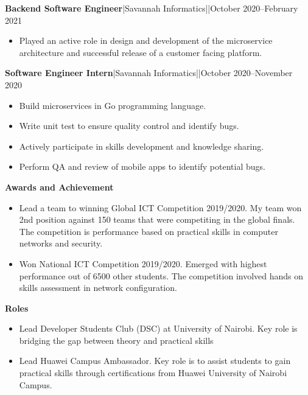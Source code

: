 \documentclass[a4paper]{article}
\begin{document}
\textbf{Backend Software Engineer}|Savannah Informatics||October 2020--February 2021

\begin{itemize}[noitemsep]
    \item Played an active role in design and development of the microservice architecture and successful release of a customer facing platform.
\end{itemize}

\textbf{Software Engineer Intern}|Savannah Informatics||October 2020--November 2020

\begin{itemize}[noitemsep]
    \item Build microservices in Go programming language.
    \item Write unit test to ensure quality control and identify bugs.
    \item Actively participate in skills development and knowledge sharing.
    \item Perform QA and review of mobile apps to identify potential bugs.
\end{itemize}

\begin{center}
    {\Large \textbf{Awards and Achievement}}
\end{center}

\begin{itemize}[noitemsep]
    \item Lead a team to winning Global ICT Competition 2019/2020. My team won 2nd position against 150 teams that were competiting in the global finals. The competition is performance based on practical skills in computer networks and security.
    \item Won National ICT Competition 2019/2020. Emerged with highest performance out of 6500 other students. The competition involved hands on skills assessment in network configuration.
\end{itemize}

\begin{center}
    {\Large \textbf{Roles}}
\end{center}

\begin{itemize}[noitemsep]
    \item Lead Developer Students Club (DSC) at University of Nairobi. Key role is bridging the gap between theory and practical skills
    \item Lead Huawei Campus Ambassador. Key role is to assist students to gain practical skills through certifications from Huawei University of Nairobi Campus.
\end{itemize}
\end{document}
